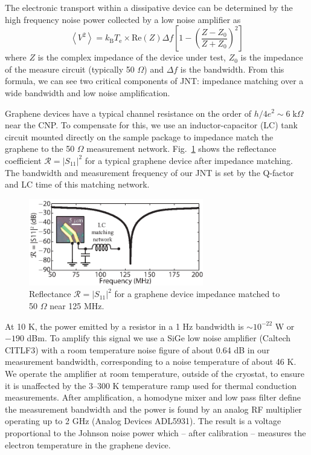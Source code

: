 The electronic transport within a dissipative device can be determined by the high frequency noise power collected by a low noise amplifier as \begin{equation}
\left\langle V^2\right\rangle = k_{\mathrm{B}}T_{\mathrm{e}} \times \mathrm{Re}(Z)\Delta f \left[1-\left(\frac{Z-Z_0}{Z+Z_0}\right)^2\right]
\end{equation}where $Z$ is the complex impedance of the device under test, $Z_0$ is the impedance of the measure circuit (typically 50 $\Omega$) and $\Delta f$ is the bandwidth.   From this formula, we can see two critical components of JNT:  impedance matching over a wide bandwidth and low noise amplification.

Graphene devices have a typical channel resistance on the order of $h/4e^2 \sim 6\; \mathrm{k}\Omega$ near the CNP.   To compensate for this, we use an inductor-capacitor (LC) tank circuit mounted directly on the sample package to impedance match the graphene to the 50 $\Omega$ measurement network.  Fig.~\ref{fig:DF_S2} shows the reflectance coefficient $\mathcal{R}=|S_{11}|^{2}$ for a typical graphene device after impedance matching.   The bandwidth and measurement frequency of our JNT is set by the Q-factor and LC time of this matching network.

 \begin{figure}
\includegraphics[width=3in]{figures/Dirac_fluid/S2.eps}
\caption{Reflectance $\mathcal{R}=|S_{11}|^{2}$ for a graphene device impedance matched to 50 $\Omega$ near 125 MHz.}
\label{fig:DF_S2}
\end{figure}

At 10 K, the power emitted by a resistor in a 1 Hz bandwidth is $\sim 10^{-22}$ W or $-190$ dBm.  To amplify this signal we use a SiGe low noise amplifier (Caltech CITLF3) with a room temperature noise figure of about 0.64 dB in our measurement bandwidth, corresponding to a noise temperature of about 46 K.   We operate the amplifier at room temperature, outside of the cryostat, to ensure it is unaffected by the 3--300 K temperature ramp used for thermal conduction measurements.  After amplification, a homodyne mixer and low pass filter define the measurement bandwidth and the power is found by an analog RF multiplier operating up to 2 GHz (Analog Devices ADL5931).  The result is a voltage proportional to the Johnson noise power which -- after calibration -- measures the electron temperature in the graphene device.

